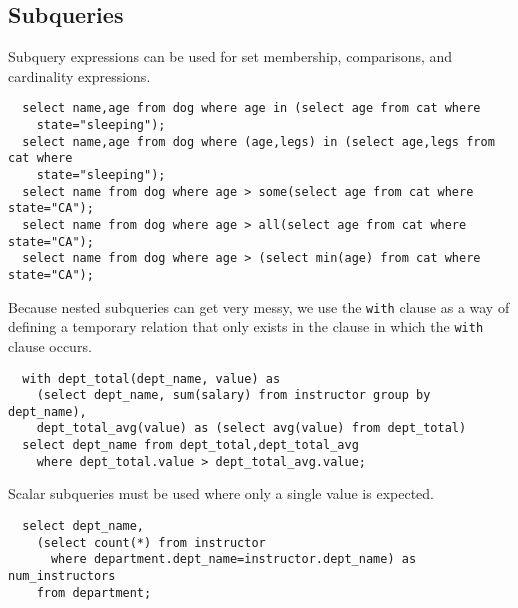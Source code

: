\documentclass{math}
\begin{document}
\subsection*{Subqueries}
Subquery expressions can be used for set membership, comparisons, and
cardinality expressions.
\begin{lstlisting}
  select name,age from dog where age in (select age from cat where
    state="sleeping");
  select name,age from dog where (age,legs) in (select age,legs from cat where
    state="sleeping");
  select name from dog where age > some(select age from cat where state="CA");
  select name from dog where age > all(select age from cat where state="CA");
  select name from dog where age > (select min(age) from cat where state="CA");
\end{lstlisting}
Because nested subqueries can get very messy, we use the \texttt{with} clause
as a way of defining a temporary relation that only exists in the clause in
which the \texttt{with} clause occurs.
\begin{lstlisting}
  with dept_total(dept_name, value) as
    (select dept_name, sum(salary) from instructor group by dept_name),
    dept_total_avg(value) as (select avg(value) from dept_total)
  select dept_name from dept_total,dept_total_avg
    where dept_total.value > dept_total_avg.value;
\end{lstlisting}
Scalar subqueries must be used where only a single value is expected.
\begin{lstlisting}
  select dept_name,
    (select count(*) from instructor
      where department.dept_name=instructor.dept_name) as num_instructors
    from department;
\end{lstlisting}
\end{document}
